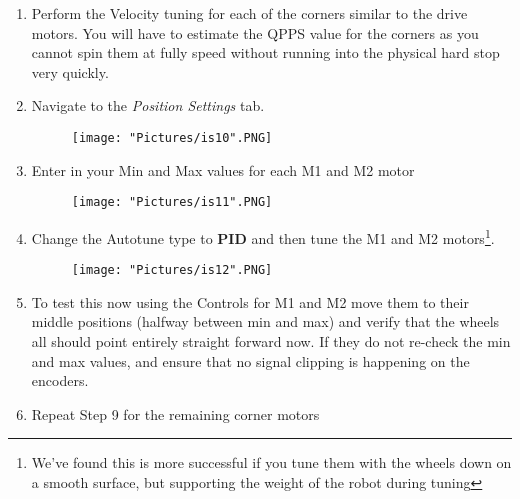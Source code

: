 \documentclass[12pt]{article}
\begin{document}
\begin{enumerate}
\begin{enumerate}
		\item Perform the Velocity tuning for each of the corners similar to the drive motors. You will have to estimate the QPPS value for the corners as you cannot spin them at fully speed without running into the physical hard stop very quickly. 

		\item Navigate to the \textit{Position Settings} tab. 

		\begin{figure}[H]
	 		\centering
			\texttt{[image: "Pictures/is10".PNG]}
	 		\caption{}
		\end{figure}
		
		\item Enter in your Min and Max values for each M1 and M2 motor

		\begin{figure}[H]
	 		\centering
			\texttt{[image: "Pictures/is11".PNG]}
	 		\caption{}
		\end{figure}	

		\item Change the Autotune type to \textbf{PID} and then tune the M1 and M2 motors\footnote{We've found this is more successful if you tune them with the wheels down on a smooth surface, but supporting the weight of the robot during tuning}. 

		\begin{figure}[H]
	 		\centering
			\texttt{[image: "Pictures/is12".PNG]}
	 		\caption{}
		\end{figure}	

		\item To test this now using the Controls for M1 and M2 move them to their middle positions (halfway between min and max) and verify that the wheels all should point entirely straight forward now. If they do not re-check the min and max values, and ensure that no signal clipping is happening on the encoders.

		\item Repeat Step 9 for the remaining corner motors
	\end{enumerate}

\end{enumerate} 
\end{document}
